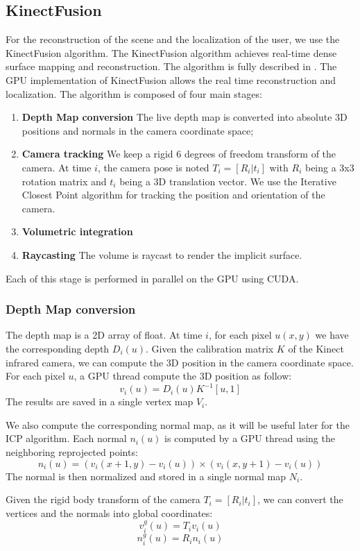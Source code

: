 \documentclass[12pt]{article}
\begin{document}
\subsection{KinectFusion}
For the reconstruction of the scene and the localization of the user, we use the KinectFusion algorithm. The KinectFusion algorithm achieves real-time dense surface mapping and reconstruction. The algorithm is fully described in \cite{KF1, KF2}. The GPU implementation of KinectFusion allows the real time reconstruction and localization. The algorithm is composed of four main stages:
\begin{enumerate}
\item \textbf{Depth Map conversion} The live depth map is converted into absolute 3D positions and normals in the camera coordinate space;
\item \textbf{Camera tracking} We keep a rigid 6 degrees of freedom transform of the camera. At time $i$, the camera pose is noted $T_i = [R_i|t_i]$ with $R_i$ being a 3x3 rotation matrix and $t_i$ being a 3D translation vector. We use the Iterative Closest Point algorithm for tracking the position and orientation of the camera.
\item \textbf{Volumetric integration}
\item \textbf{Raycasting} The volume is raycast to render the implicit surface.
\end{enumerate}

Each of this stage is performed in parallel on the GPU using CUDA.

\subsubsection{Depth Map conversion}
The depth map is a 2D array of float. At time $i$, for each pixel $u(x,y)$ we have the corresponding depth $D_i(u)$. Given the calibration matrix $K$ of the Kinect infrared camera, we can compute the 3D position in the camera coordinate space. For each pixel $u$, a GPU thread compute the 3D position as follow:
$$v_i(u) = D_i(u)K^{-1}[u,1]$$
The results are saved in a single vertex map $V_i$.

We also compute the corresponding normal map, as it will be useful later for the ICP algorithm. Each normal $n_i(u)$ is computed by a GPU thread using the neighboring reprojected points:
$$n_i(u) = (v_i(x+1,y) - v_i(u))\times (v_i(x,y+1) - v_i(u))$$
The normal is then normalized and stored in a single normal map $N_i$.

Given the rigid body transform of the camera $T_i = [R_i|t_i]$, we can convert the vertices and the normals into global coordinates:
$$v_i^g(u) = T_iv_i(u)$$
$$n_i^g(u) = R_in_i(u)$$
\end{document}
